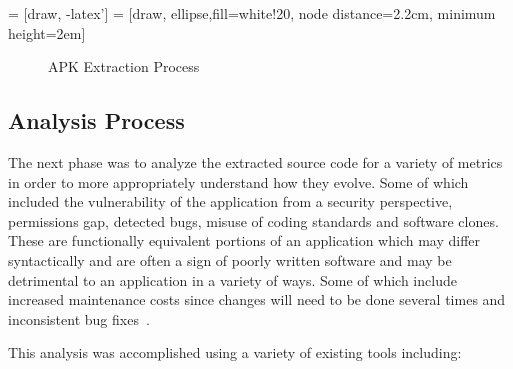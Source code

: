 \documentclass{sig-alternate}
\begin{document}
\begin{center}



 = [draw, -latex']
 = [draw, ellipse,fill=white!20, node distance=2.2cm,
    minimum height=2em]
\begin{figure}[h]
\caption{APK Extraction Process}
\label{fig:extractionprocess}
\end{figure}
\end{center}

\subsection{Analysis Process}
\label{sec: analysis}

The next phase was to analyze the extracted source code for a variety of metrics in order to more appropriately understand how they evolve. Some of which included the vulnerability of the application from a security perspective, permissions gap, detected bugs, misuse of coding standards and software clones. These are functionally equivalent portions of an application which may differ syntactically and are often a sign of poorly written software and may be detrimental to an application in a variety of ways. Some of which include increased maintenance costs since changes will need to be done several times and inconsistent bug fixes~\cite{Roy:2009:CEC:1530898.1531101}.

This analysis was accomplished using a variety of existing tools including:
\end{document}
